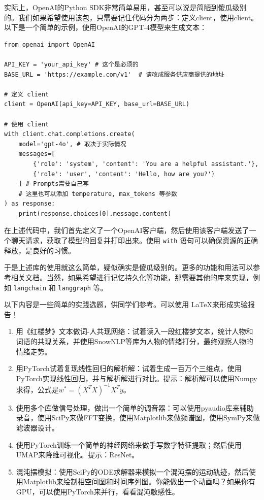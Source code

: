 实际上，OpenAI的Python SDK非常简单易用，甚至可以说是简陋到傻瓜级别的。我们如果希望使用该包，只需要记住代码分为两步：定义client，使用client。以下是一个简单的示例，使用OpenAI的GPT-4模型来生成文本：
\begin{verbatim}
from openai import OpenAI

API_KEY = 'your_api_key' # 这个是必须的
BASE_URL = 'https://example.com/v1'  # 请改成服务供应商提供的地址

# 定义 client
client = OpenAI(api_key=API_KEY, base_url=BASE_URL)

# 使用 client
with client.chat.completions.create(
    model='gpt-4o', # 取决于实际情况
    messages=[
        {'role': 'system', 'content': 'You are a helpful assistant.'},
        {'role': 'user', 'content': 'Hello, how are you?'}
    ] # Prompts需要自己写
    # 这里也可以添加 temperature, max_tokens 等参数
) as response:
    print(response.choices[0].message.content)
\end{verbatim}

在上述代码中，我们首先定义了一个OpenAI客户端，然后使用该客户端发送了一个聊天请求，获取了模型的回复并打印出来。使用 \texttt{with} 语句可以确保资源的正确释放，是良好的习惯。

于是上述库的使用就这么简单，疑似确实是傻瓜级别的。更多的功能和用法可以参考相关文档。当然，如果希望进行记忆持久化等功能，那需要其他的库来实现，例如 \texttt{langchain} 和 \texttt{langgraph} 等。


\begin{thinking}
  以下内容是一些简单的实践选题，供同学们参考。可以使用 \LaTeX 来形成实验报告！
  \begin{enumerate}
    \item 用《红楼梦》文本做词-人共现网络：试着读入一段红楼梦文本，统计人物和词语的共现关系，并使用SnowNLP等库为人物的情绪打分，最终观察人物的情绪走势。
    \item 用PyTorch试着复现线性回归的解析解：试着生成一百万个三维点，使用PyTorch实现线性回归，并与解析解进行对比。提示：解析解可以使用Numpy求得，公式是$w^* = (X^TX)^{-1}X^Ty$。
    \item 使用多个库做信号处理，做出一个简单的调音器：可以使用pyaudio库来辅助录音，使用SciPy来做FFT变换，使用Matplotlib来做频谱图，使用SymPy来做滤波器设计。
    \item 使用PyTorch训练一个简单的神经网络来做手写数字特征提取；然后使用UMAP来降维可视化。提示：ResNet。
    \item 混沌摆模拟：使用SciPy的ODE求解器来模拟一个混沌摆的运动轨迹，然后使用Matplotlib来绘制相空间图和时间序列图。你能做出一个动画吗？如果你有GPU，可以使用PyTorch来并行，看看混沌敏感性。
  \end{enumerate}
\end{thinking}
